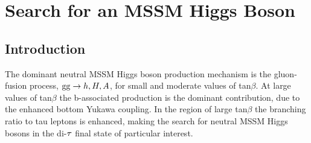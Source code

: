 \chapter{Search for an MSSM Higgs Boson}
\section{Introduction}

The dominant neutral MSSM Higgs boson production mechanism is the gluon-fusion process, 
$\mathrm{g}\mathrm{g} \to h, H, A$, for small and moderate values of tan$\beta$. At large values of tan$\beta$ 
the b-associated production is the dominant contribution, due to the enhanced bottom Yukawa 
coupling. In the region of large tan$\beta$ the branching ratio to tau leptons is enhanced, 
making the search for neutral MSSM Higgs bosons in the di-$\mathrm{\tau}$ final state of particular interest. 

